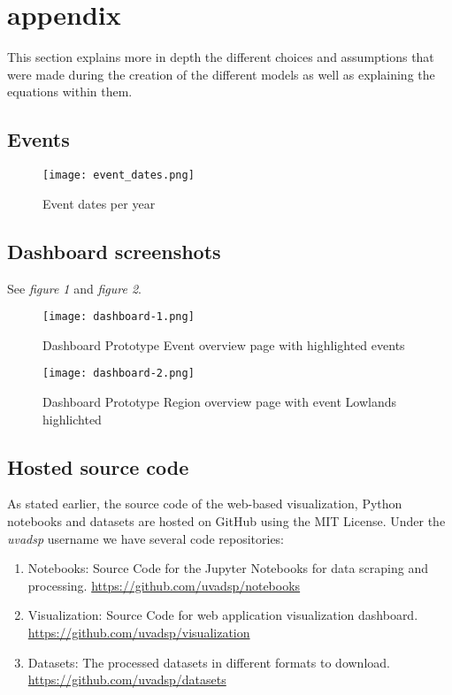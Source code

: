 \section{appendix}

This section explains more in depth the different choices and assumptions that were made during the creation of the different models as well as explaining the equations within them.

\subsection{Events}
\begin{figure*}[!htbp]
    \texttt{[image: event\_dates.png]}
    \caption{Event dates per year}
    \label{fig:event_dates}
\end{figure*}

\subsection{Dashboard screenshots}

See \textit{figure 1} and \textit{figure 2}.

\begin{figure*}[!htbp]
    \texttt{[image: dashboard-1.png]}
    \caption{Dashboard Prototype Event overview page with highlighted events}
    \label{fig:event}
\end{figure*}

\begin{figure*}[!htbp]
    \texttt{[image: dashboard-2.png]}
    \caption{Dashboard Prototype Region overview page with event Lowlands highlichted }
    \label{fig:event}
\end{figure*}

\subsection{Hosted source code}

As stated earlier, the source code of the web-based visualization, Python notebooks and datasets are hosted on GitHub using the MIT License. Under the \textit{uvadsp} username we have several code repositories:

\begin{enumerate}
  \item Notebooks: Source Code for the Jupyter Notebooks for data scraping and processing. \underline{https://github.com/uvadsp/notebooks}
  \item Visualization: Source Code for web application visualization dashboard. \underline{https://github.com/uvadsp/visualization}
  \item Datasets: The processed datasets in different formats to download. \underline{https://github.com/uvadsp/datasets}
\end{enumerate}

